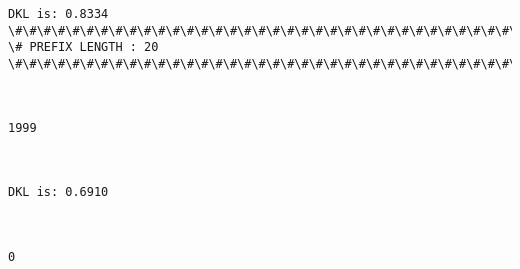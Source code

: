 \documentclass[11pt]{article}
\begin{document}
    \begin{Verbatim}[commandchars=\\\{\}]
DKL is: 0.8334
\#\#\#\#\#\#\#\#\#\#\#\#\#\#\#\#\#\#\#\#\#\#\#\#\#\#\#\#\#\#\#\#\#\#\#\#\#\#\#\#\#\#\#\#\#\#\#\#\#\#\#\#\#\#\#\#\#\#\#\#\#\#\#\#\#\#\#\#\#\#\#\#\#\#\#\#
\# PREFIX LENGTH : 20
\#\#\#\#\#\#\#\#\#\#\#\#\#\#\#\#\#\#\#\#\#\#\#\#\#\#\#\#\#\#\#\#\#\#\#\#\#\#\#\#\#\#\#\#\#\#\#\#\#\#\#\#\#\#\#\#\#\#\#\#\#\#\#\#\#\#\#\#\#\#\#\#\#\#\#\#

    \end{Verbatim}

    \begin{center}
    \end{center}
    { \hspace*{\fill} \\}
    
    \begin{Verbatim}[commandchars=\\\{\}]
1999

    \end{Verbatim}

    \begin{center}
    \end{center}
    { \hspace*{\fill} \\}
    
    \begin{Verbatim}[commandchars=\\\{\}]
DKL is: 0.6910

    \end{Verbatim}

    \begin{center}
    \end{center}
    { \hspace*{\fill} \\}
    
    \begin{Verbatim}[commandchars=\\\{\}]
0

    \end{Verbatim}
\end{document}

